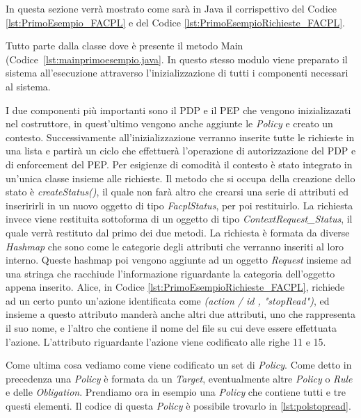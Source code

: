 In questa sezione verrà mostrato come sarà in Java il corrispettivo del Codice \ref{lst:PrimoEsempio_FACPL} e del Codice \ref{lst:PrimoEsempioRichieste_FACPL}.\\ \par
Tutto parte dalla classe dove è presente il metodo Main (Codice~\ref{lst:mainprimoesempio.java}. In questo stesso modulo viene preparato il sistema all'esecuzione attraverso l'inizializzazione di tutti i componenti necessari al sistema.\\ \par
I due componenti più importanti sono il PDP e il PEP che vengono inizializazati nel costruttore, in quest'ultimo vengono anche aggiunte le \textit{Policy} e creato un contesto. Successivamente all'inizializzazione verranno inserite tutte le richieste in una lista e partirà un ciclo che effettuerà l'operazione di autorizzazione del PDP e di enforcement del PEP.
Per esigienze di comodità il contesto è stato integrato in un'unica classe insieme alle richieste.
Il metodo che si occupa della creazione dello stato è \textit{createStatus()}, il quale non farà altro che crearsi una serie di attributi ed inseririrli in un nuovo oggetto di tipo \textit{FacplStatus}, per poi restituirlo.
La richiesta invece viene restituita sottoforma di un oggetto di tipo \textit{ContextRequest\_Status}, il quale verrà restituto dal primo dei due metodi. La richiesta è formata da diverse \textit{Hashmap} che sono come le categorie degli attributi che verranno inseriti al loro interno.
Queste hashmap poi vengono aggiunte ad un oggetto \textit{Request} insieme ad una stringa che racchiude l'informazione riguardante la categoria dell'oggetto appena inserito.
Alice, in Codice \ref{lst:PrimoEsempioRichieste_FACPL}, richiede ad un certo punto un'azione identificata come \textit{(action / id , "stopRead")}, ed insieme a questo attributo manderà anche altri due attributi, uno che rappresenta il suo nome, e l'altro che contiene il nome del file su cui deve essere effettuata l'azione. L'attributo riguardante l'azione viene codificato alle righe 11 e 15.\\ \par
Come ultima cosa vediamo come viene codificato un set di \textit{Policy}. Come detto in precedenza una \textit{Policy} è formata da un \textit{Target}, eventualmente altre \textit{Policy} o \textit{Rule} e delle \textit{Obligation}. Prendiamo ora in esempio una \textit{Policy} che contiene tutti e tre questi elementi. Il codice di questa \textit{Policy} è possibile trovarlo in \ref{lst:polstopread}.
